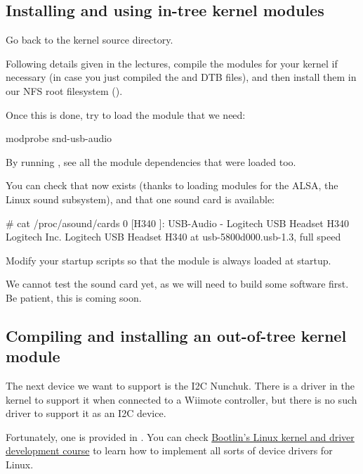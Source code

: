 \subsection{Installing and using in-tree kernel modules}

Go back to the kernel source directory.

Following details given in the lectures, compile the modules for your
kernel if necessary (in case you just compiled the  and
DTB files), and then install them in our NFS root filesystem
().

Once this is done, try to load the module that we need:

\begin{bashinput}
modprobe snd-usb-audio
\end{bashinput}

By running , see all the module dependencies that
were loaded too.

You can check that  now exists (thanks to loading
modules for the ALSA, the Linux sound subsystem), and that one sound
card is available:

\begin{bashinput}
# cat /proc/asound/cards
 0 [H340           ]: USB-Audio - Logitech USB Headset H340
                      Logitech Inc. Logitech USB Headset H340 at usb-5800d000.usb-1.3, full speed
\end{bashinput}

Modify your startup scripts so that the  module
is always loaded at startup.

We cannot test the sound card yet, as we will need to build some
software first. Be patient, this is coming soon.

\subsection{Compiling and installing an out-of-tree kernel module}

The next device we want to support is the I2C Nunchuk. There is a driver
in the kernel to support it when connected to a Wiimote controller, but
there is no such driver to support it as an I2C device.

Fortunately, one is provided in
. You can check
\href{https://bootlin.com/training/kernel/}{Bootlin's Linux kernel and
driver development course} to learn how to implement all sorts of device
drivers for Linux.

